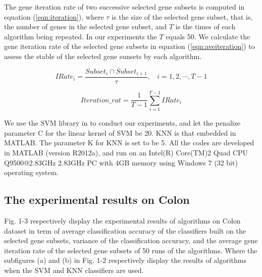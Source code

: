 \documentclass[runningheads,a4paper]{llncs}
\begin{document}
The gene iteration rate of two successive selected gene subsets is computed in equation (\ref{eqn:iteration}), where $\tau$ is the size of the selected gene subset, that is, the number of genes in the selected gene subset, and $T$ is the times of each algorithm being repeated. In our experiments the $T$ equals 50. We calculate the gene iteration rate of the selected gene subsets in equation (\ref{eqn:aveiteration}) to assess the stable of the selected gene sunsets by each algorithm.


\begin{equation}\label{eqn:iteration}
IRate_i = \frac{ Subset_i \cap Subset_{i+1} } {\tau},~~~~i = 1, 2, \cdots, T-1
\end{equation}

\begin{equation}\label{eqn:aveiteration}
Iteration\_rat= \frac{1}{T-1}\sum\limits_{i=1}^{T-1}{IRate_i}
\end{equation}

We use the SVM library in \cite{chang2011libsvm} to conduct our experiments, and let the penalize parameter C for the linear kernel of SVM be 20. KNN is that embedded in MATLAB. The parameter K for KNN is set to be 5. All the codes are developed in MATLAB (version  R2012a), and run on an Intel(R) Core(TM)2 Quad CPU Q9500@2.83GHz 2.83GHz PC with 4GB memory using Windows 7 (32 bit) operating system.

\subsection{The experimental results on Colon}

Fig. 1-3 respectively display the experimental results of algorithms on Colon dataset in term of average classification accuracy of the classifiers built on the selected gene subsets, variance of the classification accuracy, and the average gene iteration rate of the selected gene subsets of 50 runs of the algorithms. Where the subfigures (a) and (b) in Fig. 1-2 respectively display the results of algorithms when the SVM and KNN classifiers are used.
\end{document}
